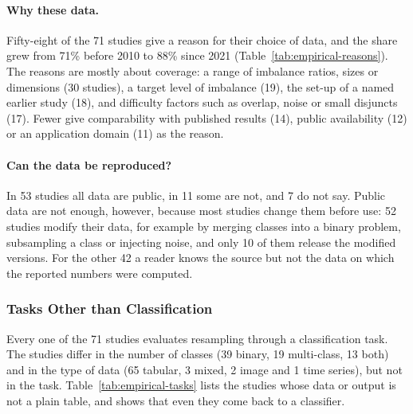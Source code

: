 

\paragraph{Why these data.} Fifty-eight of the 71 studies give a reason for their choice of data, and the share grew from 71\% before 2010 to 88\% since 2021 (Table~\ref{tab:empirical-reasons}). The reasons are mostly about coverage: a range of imbalance ratios, sizes or dimensions (30 studies), a target level of imbalance (19), the set-up of a named earlier study (18), and difficulty factors such as overlap, noise or small disjuncts (17). Fewer give comparability with published results (14), public availability (12) or an application domain (11) as the reason.



\paragraph{Can the data be reproduced?} In 53 studies all data are public, in 11 some are not, and 7 do not say. Public data are not enough, however, because most studies change them before use: 52 studies modify their data, for example by merging classes into a binary problem, subsampling a class or injecting noise, and only 10 of them release the modified versions. For the other 42 a reader knows the source but not the data on which the reported numbers were computed.

\subsubsection{Tasks Other than Classification}
\label{sec:empirical-tasks}

Every one of the 71 studies evaluates resampling through a classification task. The studies differ in the number of classes (39 binary, 19 multi-class, 13 both) and in the type of data (65 tabular, 3 mixed, 2 image and 1 time series), but not in the task. Table~\ref{tab:empirical-tasks} lists the studies whose data or output is not a plain table, and shows that even they come back to a classifier.



